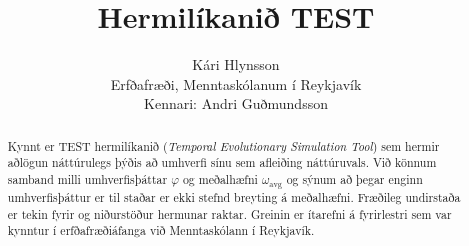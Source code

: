 \documentclass[12pt]{article}
\title{\bfseries Hermilíkanið TEST}
\author{Kári Hlynsson \vspace*{2mm} \\ \small Erfðafræði, Menntaskólanum í Reykjavík \\ \small Kennari: Andri Guðmundsson}
\date{}
\begin{document}
\maketitle

\begin{abstract}
    \noindent
    Kynnt er TEST hermilíkanið (\emph{Temporal Evolutionary Simulation Tool}) sem hermir
    aðlögun náttúrulegs þýðis að umhverfi sínu sem afleiðing náttúruvals. Við könnum
    samband milli umhverfisþáttar $\varphi$ og meðalhæfni $\omega_{\mathrm{avg}}$ og sýnum að
    þegar enginn umhverfisþáttur er til staðar er ekki stefnd breyting á meðalhæfni. Fræðileg
    undirstaða er tekin fyrir og niðurstöður hermunar raktar. Greinin er ítarefni á fyrirlestri
    sem var kynntur í erfðafræðiáfanga við Menntaskólann í Reykjavík.
\end{abstract}
\end{document}
